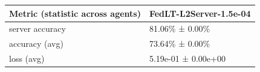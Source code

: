 \begin{tabular}{ll}
\hline
 Metric (statistic across agents)   & FedLT-L2Server-1.5e-04   \\
\hline
 server accuracy                    & 81.06\% ± 0.00\%           \\
 accuracy (avg)                     & 73.64\% ± 0.00\%           \\
 loss (avg)                         & 5.19e-01 ± 0.00e+00      \\
\hline
\end{tabular}